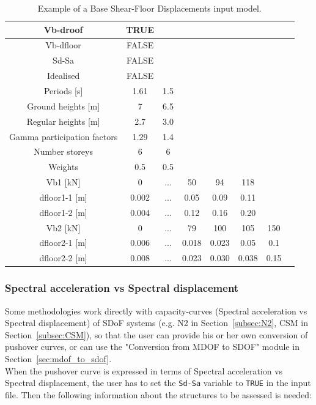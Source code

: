 \begin {table}[htb]
\caption{Example of a Base Shear-Floor Displacements input model.}
\label{table:Vb-dfloor_input}
\begin{center}
  \begin{tabular}{ | c | c | c | c | c | c | c | c |}
  \hline
    Vb-droof & TRUE &  &  & & & \\ \hline
    Vb-dfloor & FALSE & & & & &  \\ \hline
    Sd-Sa & FALSE & & & & & \\ \hline
    Idealised & FALSE & & & & & \\ \hline
    Periods [s] & 1.61 & 1.5 & & & & \\ \hline
    Ground heights [m] & 7 & 6.5 & & & & \\ \hline
    Regular heights [m] & 2.7 & 3.0 & & & & \\ \hline
    Gamma participation factors & 1.29 & 1.4 & & & & \\ \hline
    Number storeys & 6 & 6 & & & & \\ \hline
    Weights & 0.5 & 0.5 & & & & \\ \hline
    Vb1 [kN] & 0	& ...	& 50	& 94	& 118	& \\ \hline
	  dfloor1-1 [m] & 0.002	& ...	& 0.05	& 0.09	& 0.11	& \\ \hline
	  dfloor1-2 [m] & 0.004	& ...	& 0.12	& 0.16	& 0.20	& \\ \hline
    Vb2 [kN] & 0	& ...	& 79	& 100	& 105	& 150 \\ \hline
    dfloor2-1 [m] & 0.006 &	...	& 0.018	& 0.023	& 0.05	& 0.1 \\ \hline
	dfloor2-2 [m] & 0.008	& ... &	0.023	& 0.030	& 0.038	& 0.15 \\ \hline
  \end{tabular}
\end{center}
\end{table}

\subsubsection{Spectral acceleration vs Spectral displacement}
\label{subsubsec:Sa-Sd}
Some methodologies work directly with capacity-curves (Spectral acceleration vs Spectral displacement) of SDoF systems (e.g. N2 in Section~\ref{subsec:N2}, CSM in Section~\ref{subsec:CSM}), so that the user can provide his or her own conversion of pushover curves, or can use the "Conversion from MDOF to SDOF" module in Section~\ref{sec:mdof_to_sdof}.\\
When the pushover curve is expressed in terms of Spectral acceleration vs Spectral displacement, the user has to set the \verb=Sd-Sa= variable to \verb=TRUE= in the input file. Then the following information about the structures to be assessed is needed:\\

